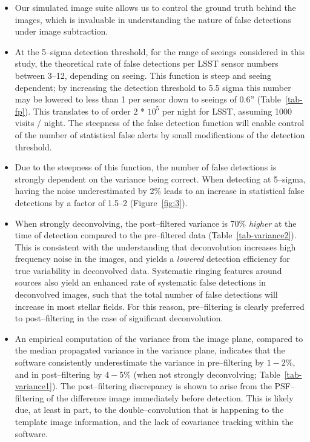 \documentclass[iop]{emulateapj}
\begin{document}
\begin{itemize}


\item Our simulated image suite allows us to control the ground truth behind the images, which is invaluable in understanding the nature of false detections under image subtraction.

\item At the 5--sigma detection threshold, for the range of seeings considered in this study, the theoretical rate of false detections per LSST sensor numbers between 3--12, depending on seeing.
  This function is steep and seeing dependent; by increasing the detection threshold to 5.5 sigma this number may be lowered to less than 1 per sensor down to seeings of 0.6'' (Table~\ref{tab-fp}).
  This translates to of order 2 * $10^5$ per night for LSST, assuming 1000 visits / night.
  The steepness of the false detection function will enable control of the number of statistical false alerts by small modifications of the detection threshold.

\item Due to the steepness of this function, the number of false detections is strongly dependent on the variance being correct.
  When detecting at 5--sigma, having the noise underestimated by 2\% leads to an increase in statistical false detections by a factor of 1.5--2 (Figure~\ref{fig:3}).

\item When strongly deconvolving, the post--filtered variance is 70\% {\it higher} at the time of detection compared to the pre--filtered data (Table~\ref{tab-variance2}).
  This is consistent with the understanding that deconvolution increases high frequency noise in the images, and yields a {\it lowered} detection efficiency for true variability in deconvolved data.
  Systematic ringing features around sources also yield an enhanced rate of systematic false detections in deconvolved images, such that the total number of false detections will increase in most stellar fields.
  For this reason, pre--filtering is clearly preferred to post--filtering in the case of significant deconvolution.


\item An empirical computation of the variance from the image plane, compared to the median propagated variance in the variance plane, indicates that the software consistently underestimate the variance in pre--filtering by $1-2\%$, and in post--filtering by $4-5\%$ (when not strongly deconvolving; Table~\ref{tab-variance1}).
  The post--filtering discrepancy is shown to arise from the PSF--filtering of the difference image immediately before detection.
  This is likely due, at least in part, to the double--convolution that is happening to the template image information, and the lack of covariance tracking within the software.


\end{itemize}
\end{document}

